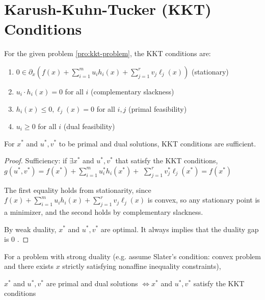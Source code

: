 \section{Karush-Kuhn-Tucker (KKT) Conditions}

For the given problem \ref{pro:kkt-problem}, the KKT conditions are:

\begin{enumerate}
    \item $ 0 \in \partial_{x}\left(f(x)+\sum_{i=1}^{m} u_{i} h_{i}(x)+\sum_{j=1}^{r} v_{j} \ell_{j}(x)\right) $ (stationary)
    \item $ u_{i} \cdot h_{i}(x)=0 $ for all $ i $ (complementary slackness)
    \item $ h_{i}(x) \leq 0, \ell_{j}(x)=0 $ for all $ i, j $ (primal feasibility)
    \item $ u_{i} \geq 0 $ for all $ i $ (dual feasibility)
\end{enumerate}

\begin{theorem}
    \label{thm:kkt-sufficient}
    For $ x^{*} $ and $ u^{*}, v^{*} $ to be primal and dual solutions, KKT conditions are sufficient.
\end{theorem}

\begin{proof}
    Sufficiency: if $ \exists x^{*} $ and $ u^{*}, v^{*} $ that satisfy the KKT conditions, $ g\left(u^{*}, v^{*}\right)=f\left(x^{*}\right)+\sum_{i=1}^{m} u_{i}^{*} h_{i}\left(x^{*}\right)+ $ $ \sum_{j=1}^{r} v_{j}^{*} \ell_{j}\left(x^{*}\right)=f\left(x^{*}\right) $ 
    
    The first equality holds from stationarity, since $ f(x)+\sum_{i=1}^{m} u_{i} h_{i}(x)+\sum_{j=1}^{r} v_{j} \ell_{j}(x) $ is convex, so any stationary point is a minimizer, and the second holds by complementary slackness. 
    
    By weak duality, $ x^{*} $ and $ u^{*}, v^{*} $ are optimal. It always implies that the duality gap is 0 .
\end{proof}

\begin{theorem}
    For a problem with strong duality (e.g. assume Slater's condition: convex problem and there exists $ x $ strictly satisfying nonaffine inequality constraints),

    $ x^{*} $ and $ u^{*}, v^{*} $ are primal and dual solutions $ \Longleftrightarrow x^{*} $ and $ u^{*}, v^{*} $ satisfy the KKT conditions
\end{theorem}



